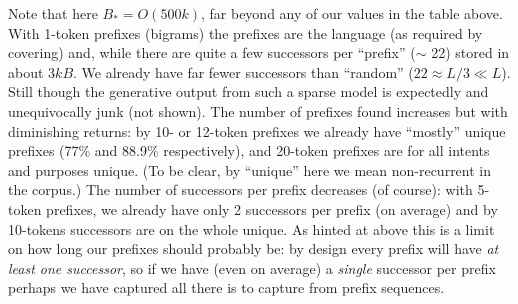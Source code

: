 \documentclass[11pt, oneside]{amsart}   	%
\begin{document}
Note that here $B_* = O(500k)$, far beyond any of our values in the table above. With 1-token prefixes (bigrams) the prefixes are the language (as required by covering) and, while there are quite a few successors per ``prefix'' ($\sim$ 22) stored in about $3kB$. We already have far fewer successors than ``random'' ($22 \approx L/3 \ll L$). Still though the generative output from such a sparse model is expectedly and unequivocally junk (not shown). The number of prefixes found increases but with diminishing returns: by 10- or 12-token prefixes we already have ``mostly'' unique prefixes (77\% and 88.9\% respectively), and 20-token prefixes are for all intents and purposes unique. (To be clear, by ``unique'' here we mean non-recurrent in the corpus.) The number of successors per prefix decreases (of course): with 5-token prefixes, we already have only 2 successors per prefix (on average) and by 10-tokens successors are on the whole unique. As hinted at above this is a limit on how long our prefixes should probably be: by design every prefix will have {\em at least one successor}, so if we have (even on average) a {\em single} successor per prefix perhaps we have captured all there is to capture from prefix sequences. 
\end{document}

